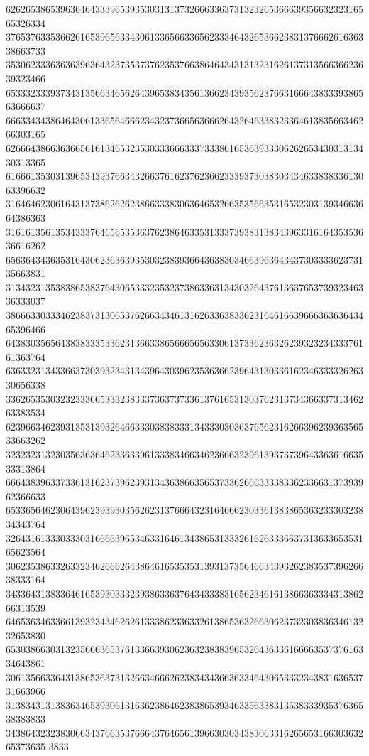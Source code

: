 62626538653963646433396539353031313732666336373132326536663935663232316565326334
37653763353662616539656334306133656633656233346432653662383137666261636338663733
35306233363636396364323735373762353766386464343131323162613731356636623639323466
65333233393734313566346562643965383435613662343935623766316664383339386563666637
66633434386464306133656466623432373665636662643264633832336461383566346266303165
62666438663636656161346532353033366633373338616536393330626265343031313430313365
61666135303139653439376634326637616237623662333937303830343463383833613063396632
31646462306164313738626262386633383063646532663535663531653230313934663664386363
31616135613534333764656535363762386463353133373938313834396331616435353636616262
65636434363531643062363639353032383936643638303466396364343730333362373135663831
31343231353838653837643065333235323738633631343032643761363765373932346336333037
38666330333462383731306537626634346131626336383362316461663966636363643465396466
64383035656438383335336231366338656665656330613733623632623932323433376161363764
63633231343366373039323431343964303962353636623964313033616234633332626330656338
33626535303232333665333238333736373733613761653130376231373436633731346263383534
62396634623931353139326466333038383331343330303637656231626639623936356533663262
32323231323035636364623363396133383466346236663239613937373964336361663533313864
66643839633733613162373962393134363866356537336266633338336233663137393962366633
65336564623064396239393035626231376664323164666230336138386536323330323834343764
32643161333033303166663965346331646134386531333261626333663731363365353165623564
30623538633263323462666264386461653535313931373564663439326238353739626638333164
34336431383364616539303332393863363764343338316562346161386636333431386266313539
64653634633661393234346262613338623363326138653632663062373230383634613232653830
65303866303132356663653761336639306236323838396532643633616666353737616334643861
30613566336431386536373132663466626238343436636334643065333234383163653731663966
31383431313836346539306131636238646238386539346335633831353833393537636538383833
34386432323830663437663537666437646561396630303438306331626565316630363265373635
3833
